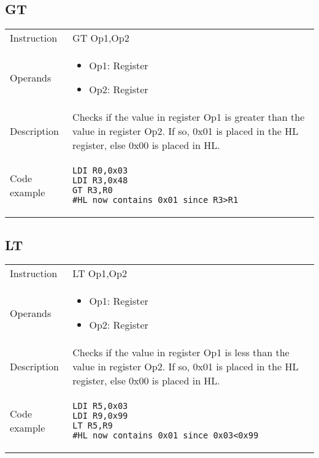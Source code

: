 \newpage

\subsection{GT}
\renewcommand*{\arraystretch}{2.0}
\begin{longtable}{P{3cm}P{9cm}}
\midrule
\noindent Instruction & GT Op1,Op2 \\
\noindent Operands &
\begin{itemize}[label={},noitemsep,leftmargin=*,topsep=0pt,partopsep=0pt, itemsep=1em]
\item Op1: Register
\item Op2: Register
\end{itemize}\\
\noindent Description & Checks if the value in register Op1 is greater than the value in register Op2. If so, 0x01 is placed in the HL register, else 0x00 is placed in HL.
	 \\
\noindent Code example & 
\begin{lstlisting}
LDI R0,0x03
LDI R3,0x48
GT R3,R0
#HL now contains 0x01 since R3>R1
\end{lstlisting} \\
\end{longtable}


\subsection{LT}
\renewcommand*{\arraystretch}{2.0}
\begin{longtable}{P{3cm}P{9cm}}
\midrule
\noindent Instruction & LT Op1,Op2 \\
\noindent Operands &
\begin{itemize}[label={},noitemsep,leftmargin=*,topsep=0pt,partopsep=0pt, itemsep=1em]
\item Op1: Register
\item Op2: Register
\end{itemize}\\
\noindent Description & Checks if the value in register Op1 is less than the value in register Op2. If so, 0x01 is placed in the HL register, else 0x00 is placed in HL.
	 \\
\noindent Code example & 
\begin{lstlisting}
LDI R5,0x03
LDI R9,0x99
LT R5,R9
#HL now contains 0x01 since 0x03<0x99
\end{lstlisting} \\
\end{longtable}


